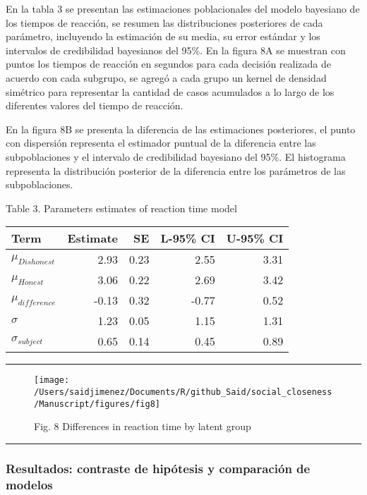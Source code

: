 \documentclass[12pt,]{article}
\begin{document}
En la tabla 3 se presentan las estimaciones poblacionales del modelo
bayesiano de los tiempos de reacción, se resumen las distribuciones
posteriores de cada parámetro, incluyendo la estimación de su media, su
error estándar y los intervalos de credibilidad bayesianos del 95\%. En
la figura 8A se muestran con puntos los tiempos de reacción en segundos
para cada decisión realizada de acuerdo con cada subgrupo, se agregó a
cada grupo un kernel de densidad simétrico para representar la cantidad
de casos acumulados a lo largo de los diferentes valores del tiempo de
reacción.

En la figura 8B se presenta la diferencia de las estimaciones
posteriores, el punto con dispersión representa el estimador puntual de
la diferencia entre las subpoblaciones y el intervalo de credibilidad
bayesiano del 95\%. El histograma representa la distribución posterior
de la diferencia entre los parámetros de las subpoblaciones.

Table 3. Parameters estimates of reaction time model

\begin{longtable}[]{@{}lrrrr@{}}
\toprule
Term & Estimate & SE & L-95\% CI & U-95\% CI\tabularnewline
\midrule
\endhead
\(\mu_{Dishonest}\) & 2.93 & 0.23 & 2.55 & 3.31\tabularnewline
\(\mu_{Honest}\) & 3.06 & 0.22 & 2.69 & 3.42\tabularnewline
\(\mu_{difference}\) & -0.13 & 0.32 & -0.77 & 0.52\tabularnewline
\(\sigma\) & 1.23 & 0.05 & 1.15 & 1.31\tabularnewline
\(\sigma_{subject}\) & 0.65 & 0.14 & 0.45 & 0.89\tabularnewline
\bottomrule
\end{longtable}

\begin{center}\rule{0.5\linewidth}{\linethickness}\end{center}

\begin{figure}

{\centering \texttt{[image: /Users/saidjimenez/Documents/R/github\_Said/social\_closeness/Manuscript/figures/fig8]} 

}

\caption{Fig. 8 Differences in reaction time by latent group}\label{fig:fig8}
\end{figure}

\begin{center}\rule{0.5\linewidth}{\linethickness}\end{center}

\subsubsection{Resultados: contraste de hipótesis y comparación de
modelos}\label{resultados-contraste-de-hipotesis-y-comparacion-de-modelos}
\end{document}
